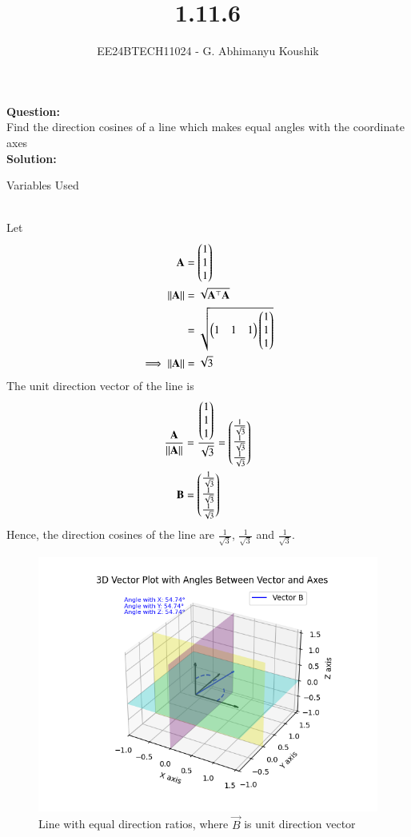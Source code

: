 \documentclass[journal]{IEEEtran}
\begin{document}

\vspace{3cm}

\title{1.11.6}
\author{EE24BTECH11024 - G. Abhimanyu Koushik
}
{\let\newpage\relax\maketitle}

\renewcommand{\thefigure}{\theenumi}
\renewcommand{\thetable}{\theenumi}
\setlength{\intextsep}{10pt} %

\textbf{Question:}\\
Find the direction cosines of a line which makes equal angles with the coordinate axes
\\
\textbf{Solution:}
\begin{table}[h!]    
  \centering
  
  \caption{Variables Used}
  \label{tab10.5.3.9.1}
\end{table}\\
Let
\begin{align}
	\mathbf{A} &= \begin{pmatrix}1\\1\\1\end{pmatrix}\\
	\left\lVert\mathbf{A}\right\rVert &= \sqrt{\mathbf{A}^\top\mathbf{A}}\\
		     &= \sqrt{\begin{pmatrix}1 & 1 & 1\end{pmatrix}\begin{pmatrix}1\\1\\1\end{pmatrix}}\\
	\implies \left\lVert\mathbf{A}\right\rVert &= \sqrt{3}
\end{align}
The unit direction vector of the line is
\begin{align}
	\frac{\mathbf{A}}{\left\lVert\mathbf{A}\right\rVert} &= \frac{\begin{pmatrix}1\\1\\1\end{pmatrix}}{\sqrt{3}} = \begin{pmatrix}\frac{1}{\sqrt{3}}\\\frac{1}{\sqrt{3}}\\\frac{1}{\sqrt{3}}\end{pmatrix}\\
	\mathbf{B} &= \begin{pmatrix}\frac{1}{\sqrt{3}}\\\frac{1}{\sqrt{3}}\\\frac{1}{\sqrt{3}}\end{pmatrix}
\end{align}
Hence, the direction cosines of the line are $\frac{1}{\sqrt{3}}$, $\frac{1}{\sqrt{3}}$ and $\frac{1}{\sqrt{3}}$.

\begin{figure}[h!]
   \centering
   \includegraphics[width=0.7\linewidth]{figs/fig.png}
   \caption{Line with equal direction ratios, where $\vec{B}$ is unit direction vector}
\end{figure}
\end{document}
